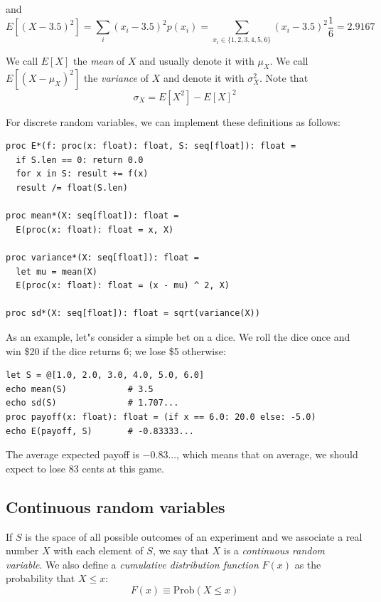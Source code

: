 \documentclass[justified, sixbynine]{tufte-book}
\def\ft{\small\tt}
\theoremstyle{plain}%
\newtheorem * {corollary}{Corollary}
\theoremstyle{definition}
\theoremstyle{remark}
\newtheorem * {remark}{Remark}
\newtheorem * {note}{Note}
\begin{document}
\begin{fullwidth}
and
\begin{equation}
E[(X-3.5)^2]=\sum_i(x_i-3.5)^2p(x_i)=\sum_{x_i\in
\{1, 2, 3, 4, 5, 6\}}(x_i-3.5)^2\frac 16=2.9167
\end{equation}

We call $E[X]$ the {\it mean} of $X$ and usually denote it with $\mu _X$.
We call $E[(X-\mu _X)^2]$ the {\it variance} of $X$ and denote it with $\sigma _X^2$. Note that
\begin{equation}
\sigma _X=E[X^2]-E[X]^2
\end{equation}

For discrete random variables, we can implement these definitions as follows:

\begin{lstlisting}[caption={in file: {\ft nlib.nim}}]
proc E*(f: proc(x: float): float, S: seq[float]): float =
  if S.len == 0: return 0.0
  for x in S: result += f(x)
  result /= float(S.len)

proc mean*(X: seq[float]): float =
  E(proc(x: float): float = x, X)

proc variance*(X: seq[float]): float =
  let mu = mean(X)
  E(proc(x: float): float = (x - mu) ^ 2, X)

proc sd*(X: seq[float]): float = sqrt(variance(X))
\end{lstlisting}

As an example, let"s consider a simple bet on a dice. We roll the dice once and win \$20 if the dice returns 6; we lose \$5 otherwise:

\begin{lstlisting}
let S = @[1.0, 2.0, 3.0, 4.0, 5.0, 6.0]
echo mean(S)            # 3.5
echo sd(S)              # 1.707...
proc payoff(x: float): float = (if x == 6.0: 20.0 else: -5.0)
echo E(payoff, S)       # -0.83333...
\end{lstlisting}

The average expected payoff is $-0.83...$, which means that on average, we should expect to lose 83 cents at this game.

\goodbreak\subsection{Continuous random variables}

If $S$ is the space of all possible outcomes of an experiment and we
associate a real number $X$ with each element of $S$, we say that $X$ is a {\it %
continuous random variable}. We also define a {\it cumulative distribution
function} $F(x)$ as the probability that $X\leq x$:
\begin{equation}
F(x)\equiv \textrm{Prob}(X\leq x)
\end{equation}


\end{fullwidth}
\end{document}
